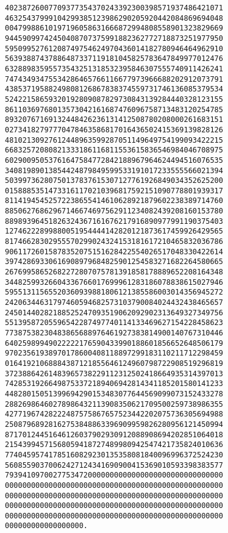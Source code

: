\footnotesize
\begin{verbatim}
40238726007709377354370243392300398571937486421071
46325437999104299385123986290205920442084869694048
00479988610197196058631666872994808558901323829669
94459099742450408707375991882362772718873251977950
59509952761208749754624970436014182780946464962910
56393887437886487337119181045825783647849977012476
63288983595573543251318532395846307555740911426241
74743493475534286465766116677973966688202912073791
43853719588249808126867838374559731746136085379534
52422158659320192809087829730843139284440328123155
86110369768013573042161687476096758713483120254785
89320767169132448426236131412508780208000261683151
02734182797770478463586817016436502415369139828126
48102130927612448963599287051149649754199093422215
66832572080821333186116811553615836546984046708975
60290095053761647584772842188967964624494516076535
34081989013854424879849599533191017233555566021394
50399736280750137837615307127761926849034352625200
01588853514733161170210396817592151090778801939317
81141945452572238655414610628921879602238389714760
88506276862967146674697562911234082439208160153780
88989396451826324367161676217916890977991190375403
12746222899880051954444142820121873617459926429565
81746628302955570299024324153181617210465832036786
90611726015878352075151628422554026517048330422614
39742869330616908979684825901254583271682264580665
26769958652682272807075781391858178889652208164348
34482599326604336766017699961283186078838615027946
59551311565520360939881806121385586003014356945272
24206344631797460594682573103790084024432438465657
24501440282188525247093519062092902313649327349756
55139587205596542287497740114133469627154228458623
77387538230483865688976461927383814900140767310446
64025989949022222176590433990188601856652648506179
97023561938970178600408118897299183110211712298459
01641921068884387121855646124960798722908519296819
37238864261483965738229112312502418664935314397013
74285319266498753372189406942814341185201580141233
44828015051399694290153483077644569099073152433278
28826986460278986432113908350621709500259738986355
42771967428222487575867657523442202075736305694988
25087968928162753848863396909959826280956121450994
87170124451646126037902930912088908694202851064018
21543994571568059418727489980942547421735824010636
77404595741785160829230135358081840096996372524230
56085590370062427124341690900415369010593398383577
79394109700277534720000000000000000000000000000000
00000000000000000000000000000000000000000000000000
00000000000000000000000000000000000000000000000000
00000000000000000000000000000000000000000000000000
00000000000000000000000000000000000000000000000000
000000000000000000.
\end{verbatim}
\normalsize

